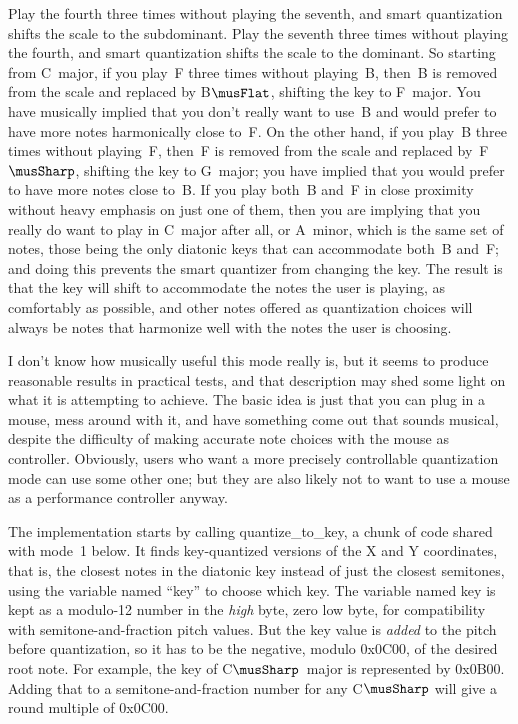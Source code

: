 Play the fourth three times without playing the seventh, and smart
quantization shifts the scale to the subdominant.  Play the seventh three
times without playing the fourth, and smart quantization shifts the scale to
the dominant.  So starting from C~major, if you play~F three times without
playing~B, then~B is removed from the scale and replaced by B$\musFlat$,
shifting the key to F~major.  You have musically implied that you don't
really want to use~B and would prefer to have more notes harmonically close
to~F.  On the other hand, if you play~B three times without playing~F,
then~F is removed from the scale and replaced by~F$\musSharp$, shifting the
key to G~major; you have implied that you would prefer to have more notes
close to~B.  If you play both~B and~F in close proximity without heavy
emphasis on just one of them, then you are implying that you really do want
to play in C~major after all, or A~minor, which is the same set of notes,
those being the only diatonic keys that can accommodate both~B and~F; and
doing this prevents the smart quantizer from changing the key.  The result
is that the key will shift to accommodate the notes the user is playing, as
comfortably as possible, and other notes offered as quantization choices
will always be notes that harmonize well with the notes the user is
choosing.

I don't know how musically useful this mode really is, but it seems to
produce reasonable results in practical tests, and that description may shed
some light on what it is attempting to achieve.  The basic idea is just that
you can plug in a mouse, mess around with it, and have something come out
that sounds musical, despite the difficulty of making accurate note choices
with the mouse as controller.  Obviously, users who want a more precisely
controllable quantization mode can use some other one; but they are also
likely not to want to use a mouse as a performance controller anyway.

The implementation starts by calling quantize\_to\_key, a chunk of code
shared with mode~1 below.  It finds key-quantized versions of the X and Y
coordinates, that is, the closest notes in the diatonic key instead of just
the closest semitones, using the variable named ``key'' to choose which key. 
The variable named key is kept as a modulo-12 number in the \emph{high}
byte, zero low byte, for compatibility with semitone-and-fraction pitch
values.  But the key value is \emph{added} to the pitch before quantization,
so it has to be the negative, modulo 0x0C00, of the desired root note.  For
example, the key of C$\musSharp$~major is represented by 0x0B00.  Adding
that to a semitone-and-fraction number for any C$\musSharp$ will give a
round multiple of 0x0C00.

